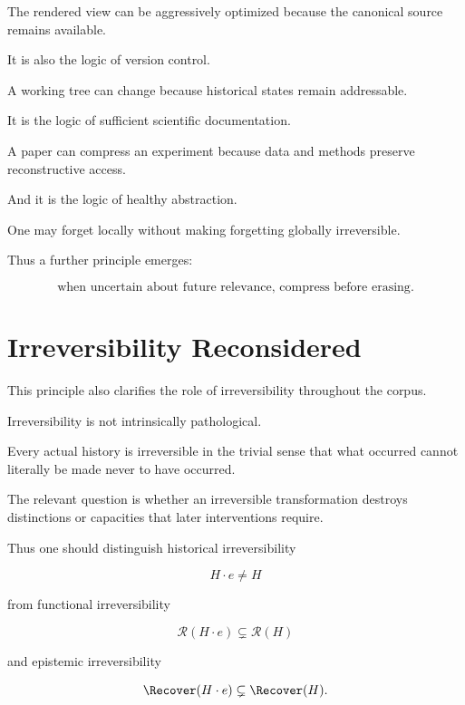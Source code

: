 \documentclass[11pt]{article}
\theoremstyle{remark}
\newcommand{\Reach}{\mathcal{R}}
\begin{document}
The rendered view can be aggressively optimized because the canonical source remains available.

It is also the logic of version control.

A working tree can change because historical states remain addressable.

It is the logic of sufficient scientific documentation.

A paper can compress an experiment because data and methods preserve reconstructive access.

And it is the logic of healthy abstraction.

One may forget locally without making forgetting globally irreversible.

Thus a further principle emerges:

\begin{equation}
\boxed{
\text{when uncertain about future relevance, compress before erasing}.
}
\end{equation}

\section{Irreversibility Reconsidered}

This principle also clarifies the role of irreversibility throughout the corpus.

Irreversibility is not intrinsically pathological.

Every actual history is irreversible in the trivial sense that what occurred cannot literally be made never to have occurred.

The relevant question is whether an irreversible transformation destroys distinctions or capacities that later interventions require.

Thus one should distinguish historical irreversibility

\begin{equation}
H\cdot e\neq H
\end{equation}

from functional irreversibility

\begin{equation}
\Reach(H\cdot e)
\subsetneq
\Reach(H)
\end{equation}

and epistemic irreversibility

\begin{equation}
\Recover(H\cdot e)
\subsetneq
\Recover(H).
\end{equation}
\end{document}
